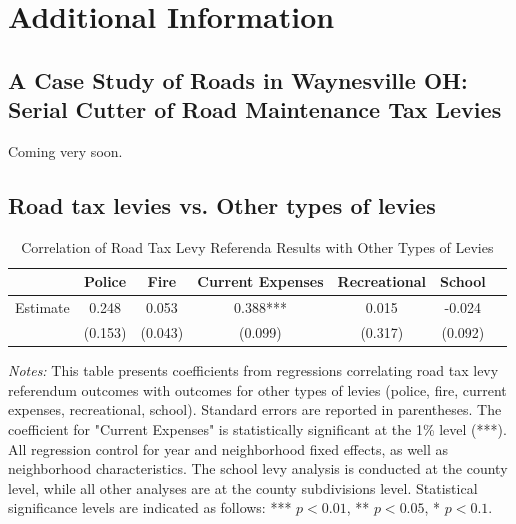 \clearpage


\section{Additional Information} \label{sec:appxc}

\subsection{A Case Study of Roads in Waynesville OH: Serial Cutter of Road Maintenance Tax Levies}

Coming very soon.

\subsection{Road tax levies vs. Other types of levies}

\begin{table}[ht!]
    \centering
    \caption{Correlation of Road Tax Levy Referenda Results with Other Types of Levies}
    \begin{tabular}{lcccccc}
    \toprule
    & Police & Fire & Current Expenses & Recreational & School \\
    \midrule
    Estimate & 0.248 & 0.053 & 0.388*** & 0.015 & -0.024 \\
    & (0.153) & (0.043) & (0.099) & (0.317) & (0.092) \\
    \bottomrule
    \end{tabular}
    \begin{minipage}{\textwidth}
    \footnotesize
    \textit{Notes:} This table presents coefficients from regressions correlating road tax levy referendum outcomes with outcomes for other types of levies (police, fire, current expenses, recreational, school). Standard errors are reported in parentheses. The coefficient for "Current Expenses" is statistically significant at the 1\% level (***). All regression control for year and neighborhood fixed effects, as well as neighborhood characteristics. The school levy analysis is conducted at the county level, while all other analyses are at the county subdivisions level. Statistical significance levels are indicated as follows: *** $p<0.01$, ** $p<0.05$, * $p<0.1$.
    \end{minipage}
\end{table}


